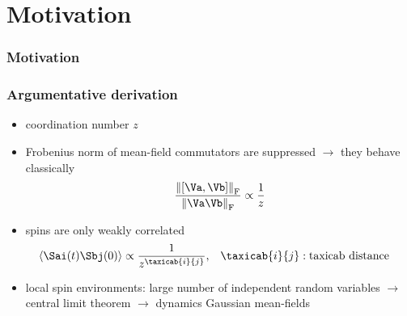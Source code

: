 \section{ Motivation }

\begin{frame}
	\frametitle{ Motivation }
    \begin{minipage}[t]{0.7\textwidth}
    \end{minipage}
\end{frame}

\begin{frame}
	\frametitle{ Argumentative derivation }
    \begin{itemize}
        \item coordination number $z$
        \item Frobenius norm of mean-field commutators are suppressed $\rightarrow$ they behave classically
        \begin{align*}
            \frac{\norm{\left[\Va,\Vb\right]}_{\text{F}}}{\norm{\Va\Vb}_{\text{F}}} \propto \frac1{z}
        \end{align*}
        \item spins are only weakly correlated
        \begin{align*}
            \expval{\Sai(t) \Sbj(0)} &\propto \frac1{z^{\taxicab{i}{j}}}, & \taxicab{i}{j}&: \text{taxicab distance} 
        \end{align*}
        \item local spin environments: large number of independent random variables
        $\rightarrow$ central limit theorem 
        $\rightarrow$ dynamics Gaussian mean-fields
    \end{itemize}
\end{frame}

